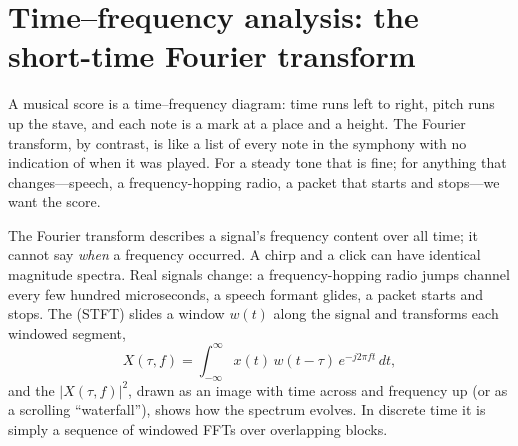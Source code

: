 \section{Time--frequency analysis: the short-time Fourier transform}
\label{sec:ch02:stft}

A musical score is a time--frequency diagram: time runs left to right, pitch runs up the stave, and
each note is a mark at a place and a height. The Fourier transform, by contrast, is like a list of
every note in the symphony with no indication of when it was played. For a steady tone that is fine;
for anything that changes---speech, a frequency-hopping radio, a packet that starts and stops---we
want the score.


The Fourier transform describes a signal's frequency content over all time; it cannot say
\emph{when} a frequency occurred. A chirp and a click can have identical magnitude spectra. Real
signals change: a frequency-hopping radio jumps channel every few hundred microseconds, a speech
formant glides, a packet starts and stops. The  (STFT) slides a
window $w(t)$ along the signal and transforms each windowed segment,
\begin{equation}
X(\tau,f)=\int_{-\infty}^{\infty}x(t)\,w(t-\tau)\,e^{-j2\pi ft}\,dt ,
\label{eq:ch02:stft}
\end{equation}
and the  $|X(\tau,f)|^2$, drawn as an image with time across and frequency up (or
as a scrolling ``waterfall''), shows how the spectrum evolves. In discrete time it is simply a
sequence of windowed FFTs over overlapping blocks.

